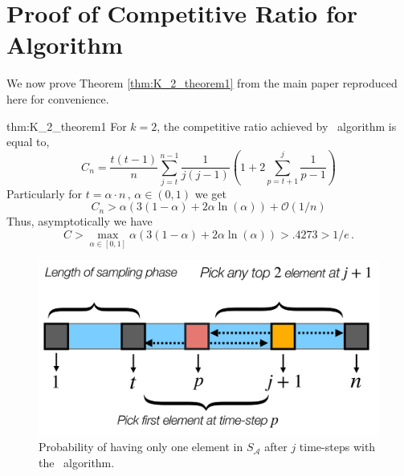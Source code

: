 \appendix
\onecolumn
\section{Proof of Competitive Ratio for \algoname Algorithm}
\label{appendix:virtual_plus_proof_k_2}

We now prove Theorem \ref{thm:K_2_theorem1} from the main paper reproduced here for convenience. 

\begin{reptheorem}{thm:K_2_theorem1}  For $k=2$, the competitive ratio achieved by \algoname\ algorithm is equal to,
\begin{equation}
    C_n = \frac{t(t-1)}{n} \sum_{j=t}^{n-1}\frac{1}{j(j-1)} \left(1 + 2 \sum_{ p=t+1}^j \frac{1}{p-1}\right)
\end{equation}
Particularly for $t= \alpha \cdot n\,,\, \alpha \in (0,1)$ we get 
\begin{equation} \label{eq:lower_bound_alpha1}
    C_n > \alpha ( 3(1-\alpha) + 2 \alpha \ln(\alpha)) + \mathcal{O}(1/n)
\end{equation}
Thus, asymptotically  we have
\begin{equation}
    C >  \max_{\alpha \in [0,1]} \alpha ( 3(1-\alpha) + 2 \alpha \ln(\alpha)) > .4273 > 1/e \, .
\end{equation}
\end{reptheorem}

\begin{figure}[ht]
    \centering
    \includegraphics[width=0.50\linewidth]{Figures/virtual_plus_k_2.pdf}
    \caption{Probability of having only one element in $S_{\mathcal{A}}$ after $j$ time-steps with the \algoname\ algorithm.}
    \label{fig:k_2}
\end{figure}

